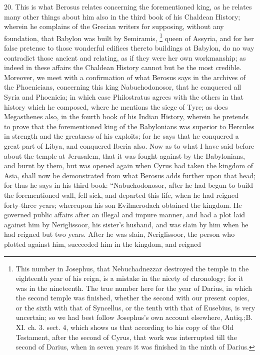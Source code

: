 20. This is what Berosus relates concerning the forementioned king, as he
relates many other things about him also in the third book of his Chaldean
History; wherein he complains of the Grecian writers for supposing,
without any foundation, that Babylon was built by Semiramis, \footnote{This number in Josephus,
that Nebuchadnezzar destroyed the temple in the eighteenth year of his
reign, is a mistake in the nicety of chronology; for it was in the
nineteenth. The true number here for the year of Darius, in which the
second temple was finished, whether the second with our present copies, or
the sixth with that of Syncellus, or the tenth with that of Eusebius, is
very uncertain; so we had best follow Josephus's own account elsewhere,
Antiq.;B. XI. ch. 3. sect. 4, which shows us that according to his copy of
the Old Testament, after the second of Cyrus, that work was interrupted
till the second of Darius, when in seven years it was finished in the
ninth of Darius.}
queen of Assyria, and for her false pretense to those wonderful edifices
thereto buildings at Babylon, do no way contradict those ancient and
relating, as if they were her own workmanship; as indeed in these affairs
the Chaldean History cannot but be the most credible. Moreover, we meet
with a confirmation of what Berosus says in the archives of the
Phoenicians, concerning this king Nabuchodonosor, that he conquered all
Syria and Phoenicia; in which case Philostratus agrees with the others in
that history which he composed, where he mentions the siege of Tyre; as
does Megasthenes also, in the fourth book of his Indian History, wherein
he pretends to prove that the forementioned king of the Babylonians was
superior to Hercules in strength and the greatness of his exploits; for he
says that he conquered a great part of Libya, and conquered Iberia also.
Now as to what I have said before about the temple at Jerusalem, that it
was fought against by the Babylonians, and burnt by them, but was opened
again when Cyrus had taken the kingdom of Asia, shall now be demonstrated
from what Berosus adds further upon that head; for thus he says in his
third book: ``Nabuchodonosor, after he had begun to build the forementioned
wall, fell sick, and departed this life, when he had reigned forty-three
years; whereupon his son Evilmerodach obtained the kingdom. He governed
public affairs after an illegal and impure manner, and had a plot laid
against him by Neriglissoor, his sister's husband, and was slain by him
when he had reigned but two years. After he was slain, Neriglissoor, the
person who plotted against him, succeeded him in the kingdom, and reigned
